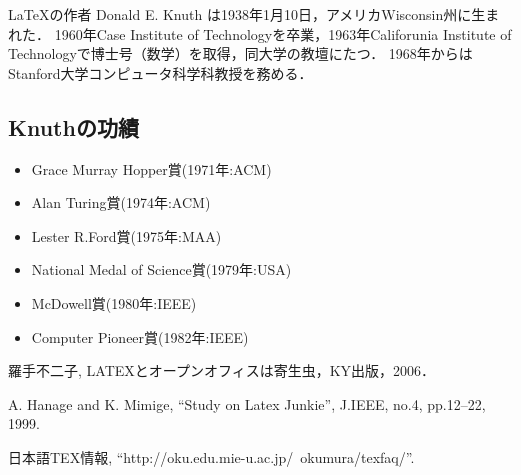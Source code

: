 \documentclass[a4j]{jbook}
\begin{document}
\LaTeX の作者 Donald E. Knuth は1938年1月10日，アメリカWisconsin州に生まれた．
1960年Case Institute of Technologyを卒業，1963年Califorunia Institute of Technologyで博士号（数学）を取得，同大学の教壇にたつ．
1968年からはStanford大学コンピュータ科学科教授を務める\cite{W3TEX}．

\subsection{Knuthの功績}

\begin{itemize}
\item Grace Murray Hopper賞(1971年:ACM)

\item Alan Turing賞(1974年:ACM)

\item Lester R.Ford賞(1975年:MAA)

\item National Medal of Science賞(1979年:USA)

\item McDowell賞(1980年:IEEE)

\item Computer Pioneer賞(1982年:IEEE)
\end{itemize}


\begin{thebibliography}{99}

羅手不二子, LATEXとオープンオフィスは寄生虫，KY出版，2006．

A. Hanage and K. Mimige, ``Study on Latex Junkie'', J.IEEE, no.4, pp.12--22, 1999.

日本語TEX情報, ``http://oku.edu.mie-u.ac.jp/~okumura/texfaq/''.

\end{thebibliography}
\end{document}
